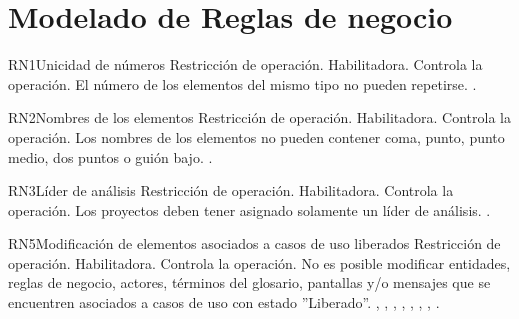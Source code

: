 \section{Modelado de Reglas de negocio}


\begin{BussinesRule}{RN1}{Unicidad de números}
	\BRitem[Tipo:] Restricción de operación. 
	\BRitem[Clase:] Habilitadora. 
	\BRitem[Nivel:] Controla la operación. %
	\BRitem[Descripción:] El número de los elementos del mismo tipo no pueden repetirse.
	 \UCref{}{}.
\end{BussinesRule}


\begin{BussinesRule}{RN2}{Nombres de los elementos}
	\BRitem[Tipo:] Restricción de operación. 
	\BRitem[Clase:] Habilitadora. 
	\BRitem[Nivel:] Controla la operación. %
	\BRitem[Descripción:] Los nombres de los elementos no pueden contener coma, punto, punto medio, dos puntos o guión bajo.
	 \UCref{}{}.
\end{BussinesRule}


\begin{BussinesRule}{RN3}{Líder de análisis}
	\BRitem[Tipo:] Restricción de operación. 
	\BRitem[Clase:] Habilitadora. 
	\BRitem[Nivel:] Controla la operación. %
	\BRitem[Descripción:] Los proyectos deben tener asignado solamente un líder de análisis.
	 \UCref{}{}.
\end{BussinesRule}


\begin{BussinesRule}{RN5}{Modificación de elementos asociados a casos de uso liberados}
	\BRitem[Tipo:] Restricción de operación. 
	\BRitem[Clase:] Habilitadora. 
	\BRitem[Nivel:] Controla la operación. %
	\BRitem[Descripción:] No es posible modificar entidades, reglas de negocio, actores, términos del glosario, pantallas y/o mensajes que se encuentren asociados a casos de uso con estado ''Liberado''.
	 , , , , , , , .
\end{BussinesRule}



